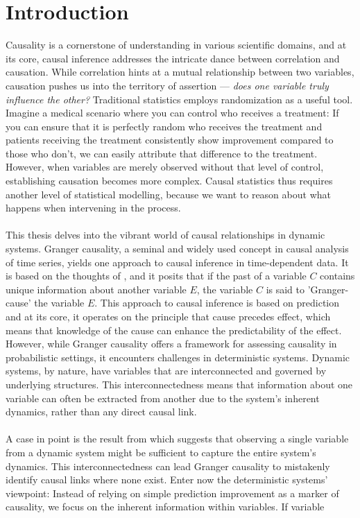 \documentclass[11pt, a4paper]{memoir}
\theoremstyle{break}
\theoremstyle{break}
\theoremstyle{nonumberplain}
\begin{document}
\chapter{Introduction}
Causality is a cornerstone of understanding in various scientific domains, and at its core, causal inference addresses the intricate dance between correlation and causation. While correlation hints at a mutual relationship between two variables, causation pushes us into the territory of assertion — \textit{does one variable truly influence the other?} Traditional statistics employs randomization as a useful tool. Imagine a medical scenario where you can control who receives a treatment: If you can ensure that it is perfectly random who receives the treatment and patients receiving the treatment consistently show improvement compared to those who don't, we can easily attribute that difference to the treatment. However, when variables are merely observed without that level of control, establishing causation becomes more complex. Causal statistics thus requires another level of statistical modelling, because we want to reason about what happens when intervening in the process.\\\\
This thesis delves into the vibrant world of causal relationships in dynamic systems. Granger causality, a seminal and widely used concept in causal analysis of time series, yields one approach to causal inference in time-dependent data. It is based on the thoughts of \cite{Granger}, and it posits that if the past of a variable $C$ contains unique information about another variable $E$, the variable $C$ is said to 'Granger-cause' the variable $E$. This approach to causal inference is based on prediction and at its core, it operates on the principle that cause precedes effect, which means that knowledge of the cause can enhance the predictability of the effect. However, while Granger causality offers a framework for assessing causality in probabilistic settings, it encounters challenges in deterministic systems. Dynamic systems, by nature, have variables that are interconnected and governed by underlying structures. This interconnectedness means that information about one variable can often be extracted from another due to the system's inherent dynamics, rather than any direct causal link.\\\\
A case in point is the result from \cite{Takens} which suggests that observing a single variable from a dynamic system might be sufficient to capture the entire system's dynamics. This interconnectedness can lead Granger causality to mistakenly identify causal links where none exist. Enter now the deterministic systems' viewpoint: Instead of relying on simple prediction improvement as a marker of causality, we focus on the inherent information within variables. If variable 
\end{document}
